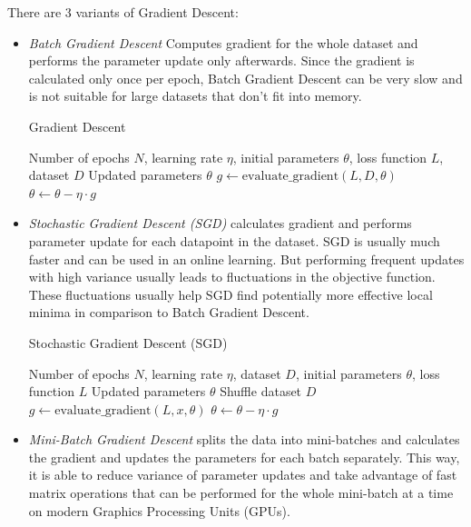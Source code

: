 There are 3 variants of Gradient Descent: \autocite{ruder2017overviewgradientdescentoptimization}
\begin{itemize}
  \item \textit{Batch Gradient Descent} Computes gradient for the whole dataset and performs the parameter update only afterwards. Since the gradient is calculated only once per epoch, Batch Gradient Descent can be very slow and is not suitable for large datasets that don't fit into memory.
    \begin{algorithm}
      \caption{Gradient Descent}
      \begin{algorithmic}[1]
        \Require Number of epochs $N$, learning rate $\eta$, initial parameters $\theta$, loss function $L$, dataset $D$
        \Ensure Updated parameters $\theta$
        \State $g \gets \text{evaluate\_gradient}(L, D, \theta)$
        \State $\theta \gets \theta - \eta \cdot g$
        \EndFor
      \end{algorithmic}
    \end{algorithm}
  \item \textit{Stochastic Gradient Descent (SGD)} calculates gradient and performs parameter update for each datapoint in the dataset. SGD is usually much faster and can be used in an online learning. But performing frequent updates with high variance usually leads to fluctuations in the objective function. These fluctuations usually help SGD find potentially more effective local minima in comparison to Batch Gradient Descent.
    \begin{algorithm}
      \caption{Stochastic Gradient Descent (SGD)}
      \begin{algorithmic}[1]
        \Require Number of epochs $N$, learning rate $\eta$, dataset $D$, initial parameters $\theta$, loss function $L$
        \Ensure Updated parameters $\theta$
        \State Shuffle dataset $D$
        \State $g \gets \text{evaluate\_gradient}(L, x, \theta)$
        \State $\theta \gets \theta - \eta \cdot g$
        \EndFor
        \EndFor
      \end{algorithmic}
    \end{algorithm}
  \item \textit{Mini-Batch Gradient Descent} splits the data into mini-batches and calculates the gradient and updates the parameters for each batch separately. This way, it is able to reduce variance of parameter updates and take advantage of fast matrix operations that can be performed for the whole mini-batch at a time on modern Graphics Processing Units (GPUs).

\end{itemize}
